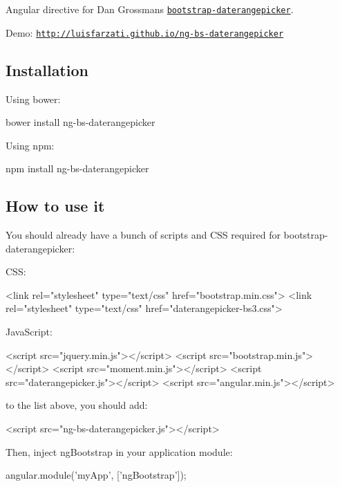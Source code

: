 Angular directive for Dan Grossman\textquotesingle{}s \href{https://github.com/dangrossman/bootstrap-daterangepicker}{\tt bootstrap-\/daterangepicker}.

Demo\+: \href{http://luisfarzati.github.io/ng-bs-daterangepicker}{\tt http\+://luisfarzati.\+github.\+io/ng-\/bs-\/daterangepicker}

\subsection*{Installation }

Using bower\+: 
\begin{DoxyCode}
bower install ng-bs-daterangepicker
\end{DoxyCode}


Using npm\+: 
\begin{DoxyCode}
npm install ng-bs-daterangepicker
\end{DoxyCode}


\subsection*{How to use it }

You should already have a bunch of scripts and C\+SS required for bootstrap-\/daterangepicker\+:

C\+SS\+: 
\begin{DoxyCode}
<link rel="stylesheet" type="text/css" href="bootstrap.min.css">
<link rel="stylesheet" type="text/css" href="daterangepicker-bs3.css">
\end{DoxyCode}


Java\+Script\+: 
\begin{DoxyCode}
<script src="jquery.min.js"></script>
<script src="bootstrap.min.js"></script>
<script src="moment.min.js"></script>
<script src="daterangepicker.js"></script>
<script src="angular.min.js"></script>
\end{DoxyCode}


to the list above, you should add\+:


\begin{DoxyCode}
<script src="ng-bs-daterangepicker.js"></script>
\end{DoxyCode}


Then, inject {\ttfamily ng\+Bootstrap} in your application module\+:


\begin{DoxyCode}
angular.module('myApp', ['ngBootstrap']);
\end{DoxyCode}


